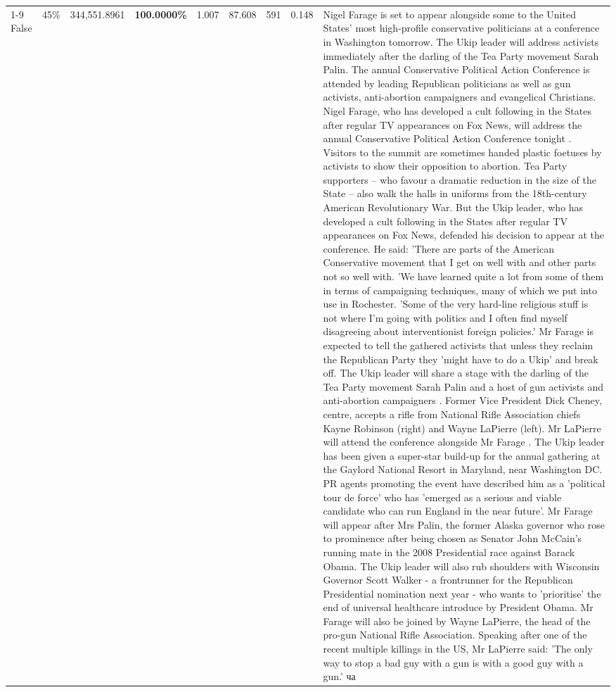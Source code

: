 \begin{table}[H]
\begin{tabular}{lllrlllll}
\cline{1-9} \cline{2-9}
False & 45\% & 344,551.8961 & \bfseries \color{red} 100.0000\% & 1.007 & 87.608 & 591 & 0.148 & Nigel Farage is set to appear alongside some to the United States' most high-profile conservative politicians at a conference in Washington tomorrow. The Ukip leader will address activists immediately after the darling of the Tea Party movement Sarah Palin. The annual Conservative Political Action Conference is attended by leading Republican politicians as well as gun activists, anti-abortion campaigners and evangelical Christians. Nigel Farage, who has developed a cult following in the States after regular TV appearances on Fox News, will address the annual Conservative Political Action Conference tonight . Visitors to the summit are sometimes handed plastic foetuses by activists to show their opposition to abortion. Tea Party supporters – who favour a dramatic reduction in the size of the State – also walk the halls in uniforms from the 18th-century American Revolutionary War. But the Ukip leader, who has developed a cult following in the States after regular TV appearances on Fox News, defended his decision to appear at the conference. He said: 'There are parts of the American Conservative movement that I get on well with and other parts not so well with. 'We have learned quite a lot from some of them in terms of campaigning techniques, many of which we put into use in Rochester. 'Some of the very hard-line religious stuff is not where I'm going with politics and I often find myself disagreeing about interventionist foreign policies.' Mr Farage is expected to tell the gathered activists that unless they reclaim the Republican Party they 'might have to do a Ukip' and break off. The Ukip leader will share a stage with the darling of the Tea Party movement Sarah Palin and a host of gun activists and anti-abortion campaigners . Former Vice President Dick Cheney, centre, accepts a rifle from National Rifle Association chiefs Kayne Robinson (right) and Wayne LaPierre (left). Mr LaPierre will attend the conference alongside Mr Farage . The Ukip leader has been given a super-star build-up for the annual gathering at the Gaylord National Resort in Maryland, near Washington DC. PR agents promoting the event have described him as a 'political tour de force' who has 'emerged as a serious and viable candidate who can run England in the near future'. Mr Farage will appear after Mrs Palin, the former Alaska governor who rose to prominence after being chosen as Senator John McCain's running mate in the 2008 Presidential race against Barack Obama. The Ukip leader will also rub shoulders with Wisconsin Governor Scott Walker - a frontrunner for the Republican Presidential nomination next year - who wants to 'prioritise' the end of universal healthcare introduce by President Obama. Mr Farage will also be joined by Wayne LaPierre, the head of the pro-gun National Rifle Association. Speaking after one of the recent multiple killings in the US, Mr LaPierre said: 'The only way to stop a bad guy with a gun is with a good guy with a gun.' ча \\

\end{tabular}
\end{table}
